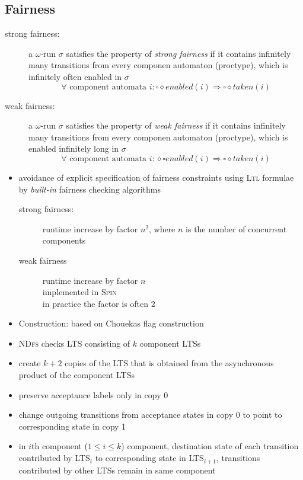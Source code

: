 \documentclass[a4paper, 10pt]{article}
\begin{document}
\subsection*{Fairness}
\begin{description}
    \item[strong fairness:] a $\omega$-run $\sigma$ satisfies the property of \emph{strong fairness} if it contains infinitely many transitions from every componen automaton (proctype), which is infinitely often enabled in $\sigma$
    \[\forall \textrm{ component automata } i:\square\diamond enabled(i)\Rightarrow\square\diamond taken(i) \]
    \item[weak fairness:] a $\omega$-run $\sigma$ satisfies the property of \emph{weak fairness} if it contains infinitely many transitions from every componen automaton (proctype), which is enabled infinitely long in $\sigma$
    \[ \forall \textrm{ component automata } i:\diamond\square enabled(i)\Rightarrow \square\diamond taken(i) \]
\end{description}
\begin{itemize}
    \item avoidance of explicit specification of fairness constraints using \textsc{Ltl} formulae by \emph{built-in} fairness checking algorithms
    \begin{description}
        \item[strong fairness:] runtime increase by factor $n^2$, where $n$ is the number of concurrent components
        \item[weak fairness] runtime increase by factor $n$\\
        implemented in \textsc{Spin} \\
        in practice the factor is often 2
    \end{description}
    \item Construction: based on Chouekas flag construction
    \item \textsc{NDfs} checks LTS consisting of $k$ component LTSs
    \item create $k+2$ copies of the LTS that is obtained from the asynchronous product of the component LTSs
    \item preserve acceptance labels only in copy 0
    \item change outgoing transitions from acceptance states in copy 0 to point to corresponding state in copy 1
    \item in $i$th component ($1\leq i \leq k$) component, destination state of each transition contributed by LTS$_i$ to corresponding state in LTS$_{i+1}$, transitions contributed by other LTSs remain in same component
    \begin{center}
    \scalebox{.75}{}
    \end{center}
\end{itemize}
\end{document}
